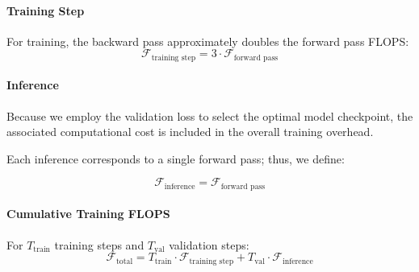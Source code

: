 \documentclass[11pt]{article}
\begin{document}
\paragraph{Training Step}
For training, the backward pass approximately doubles the forward pass FLOPS:
\begin{equation}
\mathcal{F}_{\text{training step}} = 3 \cdot \mathcal{F}_{\text{forward pass}}
\end{equation}

\paragraph{Inference}
Because we employ the validation loss to select the optimal model checkpoint, the associated computational cost is included in the overall training overhead. 

Each inference corresponds to a single forward pass; thus, we define:

\begin{equation}
\mathcal{F}_{\text{inference}} = \mathcal{F}_{\text{forward pass}}
\end{equation}

\paragraph{Cumulative Training FLOPS}
For $T_{\text{train}}$ training steps and $T_{\text{val}}$ validation steps:
\begin{equation}
\mathcal{F}_{\text{total}} = T_{\text{train}} \cdot \mathcal{F}_{\text{training step}} + T_{\text{val}} \cdot \mathcal{F}_{\text{inference}}
\end{equation}
\end{document}
